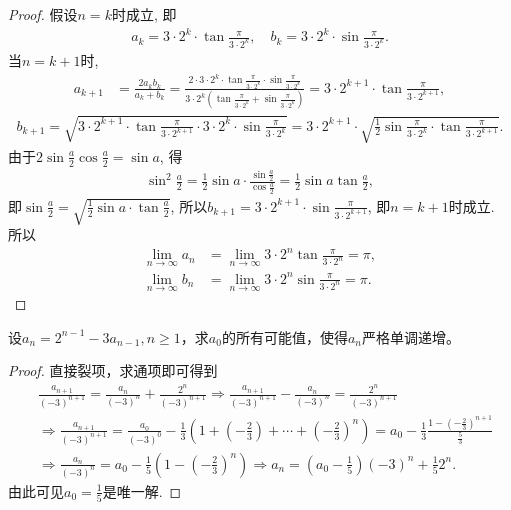 \documentclass[../../main.tex]{subfiles}%
\begin{document}
\begin{proof}
假设$n = k$时成立, 即
\begin{align*}
a_k = 3 \cdot 2^k \cdot \tan \frac{\pi}{3 \cdot 2^k}, \quad b_k = 3 \cdot 2^k \cdot \sin \frac{\pi}{3 \cdot 2^k}.
\end{align*}
当$n = k + 1$时,
\begin{align*}
a_{k+1} &= \frac{2 a_k b_k}{a_k + b_k} = \frac{2 \cdot 3 \cdot 2^k \cdot \tan \frac{\pi}{3 \cdot 2^k} \cdot \sin \frac{\pi}{3 \cdot 2^k}}{3 \cdot 2^k \left( \tan \frac{\pi}{3 \cdot 2^k} + \sin \frac{\pi}{3 \cdot 2^k} \right)} 
= 3 \cdot 2^{k+1} \cdot \tan \frac{\pi}{3 \cdot 2^{k+1}},
\end{align*}
\begin{align*}
b_{k+1} = \sqrt{3 \cdot 2^{k+1} \cdot \tan \frac{\pi}{3 \cdot 2^{k+1}} \cdot 3 \cdot 2^k \cdot \sin \frac{\pi}{3 \cdot 2^k}} = 3 \cdot 2^{k+1} \cdot \sqrt{\frac{1}{2} \sin \frac{\pi}{3 \cdot 2^k} \cdot \tan \frac{\pi}{3 \cdot 2^{k+1}}}.
\end{align*}
由于$2 \sin \frac{a}{2} \cos \frac{a}{2} = \sin a$, 得
\begin{align*}
\sin^2 \frac{a}{2} = \frac{1}{2} \sin a \cdot \frac{\sin \frac{a}{2}}{\cos \frac{a}{2}} = \frac{1}{2} \sin a \tan \frac{a}{2},
\end{align*}
即$\sin \frac{a}{2} = \sqrt{\frac{1}{2} \sin a \cdot \tan \frac{a}{2}}$, 所以$b_{k+1} = 3 \cdot 2^{k+1} \cdot \sin \frac{\pi}{3 \cdot 2^{k+1}}$, 即$n = k + 1$时成立.
所以
\begin{align*}
\lim\limits_{n \to \infty} a_n &= \lim\limits_{n \to \infty} 3 \cdot 2^n \tan \frac{\pi}{3 \cdot 2^n} = \pi, \\
\lim\limits_{n \to \infty} b_n&= \lim\limits_{n \to \infty} 3 \cdot 2^n \sin \frac{\pi}{3 \cdot 2^n} = \pi.
\end{align*}
\end{proof}

\begin{example}
设\(a_n = 2^{n - 1}-3a_{n - 1},n\geqslant 1\)，求\(a_0\)的所有可能值，使得\(a_n\)严格单调递增。
\end{example}
\begin{proof}
直接裂项，求通项即可得到
\begin{align*}
&\frac{a_{n+1}}{(-3)^{n+1}}=\frac{a_n}{(-3)^n}+\frac{2^n}{(-3)^{n+1}}\Rightarrow \frac{a_{n+1}}{(-3)^{n+1}}-\frac{a_n}{(-3)^n}=\frac{2^n}{(-3)^{n+1}}
\\
&\Rightarrow \frac{a_{n+1}}{(-3)^{n+1}}=\frac{a_0}{(-3)^0}-\frac{1}{3}\left( 1+\left( -\frac{2}{3} \right) +\cdots +\left( -\frac{2}{3} \right) ^n \right) =a_0-\frac{1}{3}\frac{1-\left( -\frac{2}{3} \right) ^{n+1}}{\frac{5}{3}}
\\
&\Rightarrow \frac{a_n}{(-3)^n}=a_0-\frac{1}{5}\left( 1-\left( -\frac{2}{3} \right) ^n \right) \Rightarrow a_n=\left( a_0-\frac{1}{5} \right) (-3)^n+\frac{1}{5}2^n.
\end{align*}
由此可见\(a_0 = \frac{1}{5}\)是唯一解.
\end{proof}
\end{document}
